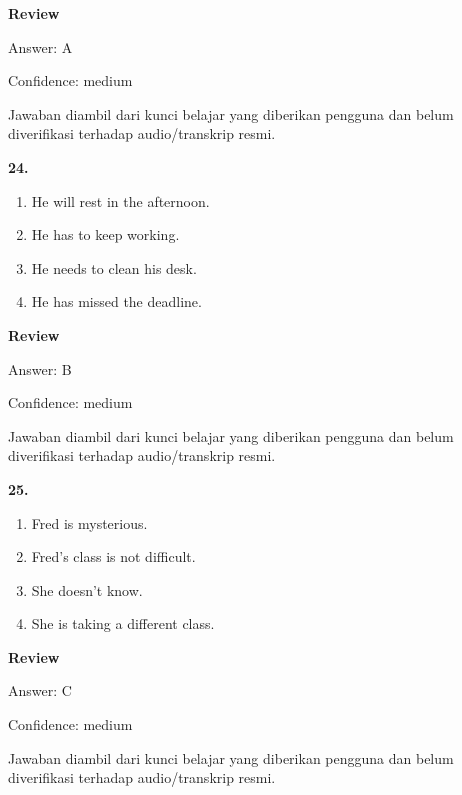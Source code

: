 \documentclass[12pt]{article}
\begin{document}
\par
\begingroup
\setlength{\parskip}{0pt}
\setlength{\parindent}{0pt}
\textbf{Review}\par
Answer: A\par
Confidence: medium\par
Jawaban diambil dari kunci belajar yang diberikan pengguna dan belum diverifikasi terhadap audio/transkrip resmi.\par
\endgroup
\par
\vspace{0.25\baselineskip}
\noindent\textbf{24.}
\begin{enumerate}[label=(\Alph*),leftmargin=*,itemsep=0.2em]
\item He will rest in the afternoon.
\item He has to keep working.
\item He needs to clean his desk.
\item He has missed the deadline.
\end{enumerate}
\par
\begingroup
\setlength{\parskip}{0pt}
\setlength{\parindent}{0pt}
\textbf{Review}\par
Answer: B\par
Confidence: medium\par
Jawaban diambil dari kunci belajar yang diberikan pengguna dan belum diverifikasi terhadap audio/transkrip resmi.\par
\endgroup
\par
\vspace{0.25\baselineskip}
\noindent\textbf{25.}
\begin{enumerate}[label=(\Alph*),leftmargin=*,itemsep=0.2em]
\item Fred is mysterious.
\item Fred's class is not difficult.
\item She doesn't know.
\item She is taking a different class.
\end{enumerate}
\par
\begingroup
\setlength{\parskip}{0pt}
\setlength{\parindent}{0pt}
\textbf{Review}\par
Answer: C\par
Confidence: medium\par
Jawaban diambil dari kunci belajar yang diberikan pengguna dan belum diverifikasi terhadap audio/transkrip resmi.\par
\endgroup
\par
\vspace{0.25\baselineskip}
\end{document}
